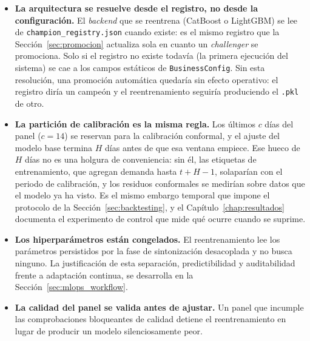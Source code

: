 \begin{itemize}
    \item \textbf{La arquitectura se resuelve desde el registro, no desde la configuración.} El \textit{backend} que se reentrena (CatBoost o LightGBM) se lee de \texttt{champion\_}\allowbreak\texttt{registry.json} cuando existe: es el mismo registro que la Sección~\ref{sec:promocion} actualiza sola en cuanto un \textit{challenger} se promociona. Solo si el registro no existe todavía (la primera ejecución del sistema) se cae a los campos estáticos de \texttt{BusinessConfig}. Sin esta resolución, una promoción automática quedaría sin efecto operativo: el registro diría un campeón y el reentrenamiento seguiría produciendo el \texttt{.pkl} de otro.
    \item \textbf{La partición de calibración es la misma regla.} Los últimos $c$ días del panel ($c = 14$) se reservan para la calibración conformal, y el ajuste del modelo base termina $H$ días antes de que esa ventana empiece. Ese hueco de $H$ días no es una holgura de conveniencia: sin él, las etiquetas de entrenamiento, que agregan demanda hasta $t+H-1$, solaparían con el periodo de calibración, y los residuos conformales se medirían sobre datos que el modelo ya ha visto. Es el mismo embargo temporal que impone el protocolo de la Sección~\ref{sec:backtesting}, y el Capítulo~\ref{chap:resultados} documenta el experimento de control que mide qué ocurre cuando se suprime.
    \item \textbf{Los hiperparámetros están congelados.} El reentrenamiento lee los parámetros persistidos por la fase de sintonización desacoplada y no busca ninguno. La justificación de esta separación, predictibilidad y auditabilidad frente a adaptación continua, se desarrolla en la Sección~\ref{sec:mlops_workflow}.
    \item \textbf{La calidad del panel se valida antes de ajustar.} Un panel que incumple las comprobaciones bloqueantes de calidad detiene el reentrenamiento en lugar de producir un modelo silenciosamente peor.
\end{itemize}

